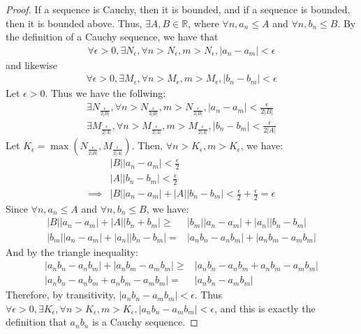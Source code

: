 \documentclass{article}
\newcommand{\reals}{\ensuremath{\mathbb{R}}}
\newcommand{\eps}{\ensuremath{\epsilon}}
\begin{document}
\begin{proof}
	If a sequence is Cauchy, then it is bounded,
	and if a sequence is bounded,
	then it is bounded above.
	Thus, $\exists A, B \in \reals$,
	where $\forall n, a_n \le A$
	and $\forall n, b_n \le B$.
	By the definition of a Cauchy sequence,
	we have that
	\begin{align}
		\forall \eps > 0, \exists N_\eps, \forall n > N_\eps, m > N_\eps, |a_n - a_m | < \eps
	\end{align}
	and likewise
	\begin{align}
		\forall \eps > 0, \exists M_\eps, \forall n > M_\eps, m > M_\eps, |b_n - b_m | < \eps
	\end{align}
	Let $\eps > 0$.
	Thus we have the follwing:
	\begin{align}
	\exists N_{\frac{\eps}{2|B|}}, \forall n >  N_\frac{\eps}{2|B|}, m > N_\frac{\eps}{2|B|},
	|a_n - a_m| < \frac{\eps}{2|B|} \\
	\exists M_{\frac{\eps}{2|A|}}, \forall n >  M_\frac{\eps}{2|A|}, m > M_\frac{\eps}{2|A|},
	|b_n - b_m| < \frac{\eps}{2|A|}
	\end{align}
	Let $K_\eps = \max(N_{\frac{\eps}{2|B|}}, M_{\frac{\eps}{2|A|}})$.
	Then, $\forall n > K_\eps, m > K_\eps$, we have:
	\begin{align}
			& |B||a_n - a_m| < \frac{\eps}{2} \\
			& |A||b_n - b_m| < \frac{\eps}{2} \\
		\implies & |B||a_n - a_m| + |A||b_n - b_m| < \frac{\eps}{2} + \frac{\eps}{2} = \eps
	\end{align}
	Since $\forall n, a_n \le A$ and $\forall n, b_n \le B$,
	we have:
	\begin{align}
		|B||a_n - a_m| + |A||b_n + b_m| \geq & |b_m||a_n - a_m| + |a_n||b_n - b_m| \\
		|b_m||a_n - a_m| + |a_n||b_n - b_m| = & |a_n b_n - a_n b_m| + |a_n b_m - a_m b_m|
	\end{align}
	And by the triangle inequality:
	\begin{align}
		|a_n b_n - a_n b_m| + |a_n b_m - a_m b_m| \geq & |a_n b_n - a_n b_m + a_n b_m - a_m b_m| \\
		|a_n b_n - a_n b_m + a_n b_m - a_m b_m| = & |a_n b_n - a_m b_m|
	\end{align}
	Therefore, by transitivity, $|a_n b_n - a_m b_m| < \eps$.
	Thus $\forall \eps > 0, \exists K_\eps, \forall n > K_\eps, m > K_\eps, |a_n b_n - a_m b_m| < \eps$,
	and this is exactly the definition that $a_n b_n$ is a Cauchy sequence.
\end{proof}
\end{document}
